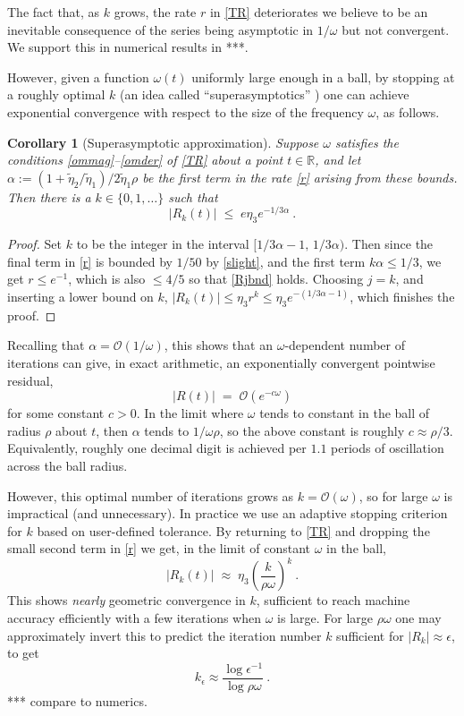 \documentclass[10pt]{article}
\newcommand{\R}{\mathbb{R}}
\newcommand{\bigO}{{\mathcal O}}
\newcommand{\eps}{\epsilon}
\newtheorem{cor}[thm]{Corollary}
\newcommand{\om}{\omega}
\newcommand{\te}{\tilde\eta}
\begin{document}
The fact that, as $k$ grows,
the rate $r$ in \cref{TR} deteriorates
we believe to be an inevitable consequence of
the series being asymptotic in $1/\om$ but not convergent.
We support this in numerical results in ***.

However, given a function $\om(t)$ uniformly large enough
in a ball,
by stopping at a roughly optimal $k$ (an idea
called ``superasymptotics'' \cite{berrysuper,boydsuper})
one can achieve
exponential convergence with respect to the size of the frequency $\om$,
as follows.

\begin{cor}[Superasymptotic approximation]\label{super}
  Suppose $\om$ satisfies the conditions \cref{ommag}--\cref{omder}
  of \cref{TR}
  about a point $t\in\R$,
  and let $\alpha := (1+\te_2/\te_1)/2\te_1\rho$ be the
  first term in the rate \cref{r} arising from these bounds.
  Then there is a $k\in\{0,1,\dots\}$ such that
  $$
  |R_k(t)| \; \le \; e \eta_3 e^{-1/3\alpha}~.
  $$
\end{cor}
\begin{proof}
  Set $k$ to be the integer in the interval $[1/3\alpha-1, \, 1/3\alpha)$.
    Then since the final term in \cref{r} is bounded by $1/50$
    by \cref{slight}, and the
    first term $k\alpha \le 1/3$, we get $r\le e^{-1}$, which
    is also $\le 4/5$ so that \cref{Rjbnd} holds.
    Choosing $j=k$, and inserting a lower bound on $k$,
    $|R_k(t)| \le \eta_3 r^k \le \eta_3 e^{-(1/3\alpha-1)}$, which
    finishes the proof.
  \end{proof}
Recalling that $\alpha = \bigO(1/\om)$, this
shows that an $\om$-dependent
number of iterations can give, in exact arithmetic, an
exponentially convergent pointwise residual,
$$
|R(t)| \;=\; \bigO(e^{-c\om})
$$
for some constant $c>0$.
In the limit where
$\om$ tends to constant in the ball of radius $\rho$ about $t$, then
$\alpha$ tends to $1/\om\rho$, so the above
constant is roughly $c\approx \rho/3$.
Equivalently, roughly one decimal digit is achieved per
$1.1$ periods of oscillation across the ball radius.

However, this optimal number of iterations grows as $k = \bigO(\om)$,
so for large $\om$ is impractical (and unnecessary).
In practice we use an adaptive stopping criterion for $k$ based
on user-defined tolerance.
By returning to \cref{TR} and dropping the small second term
in \cref{r} we get, in the limit of constant $\om$ in the ball,
$$
|R_k(t)| \; \approx \; \eta_3 \left( \frac{k}{\rho\om}\right)^k~.
$$
This shows \textit{nearly} geometric convergence in $k$,
sufficient to reach machine accuracy efficiently with a few iterations
when $\om$ is large.
For large $\rho\om$ one may approximately invert this to predict the iteration number $k$ sufficient for $|R_k| \approx \eps$, to get
$$
k_\eps \approx \frac{\log \eps^{-1}}{\log \rho\om}~.
$$
*** compare to numerics.
\end{document}
